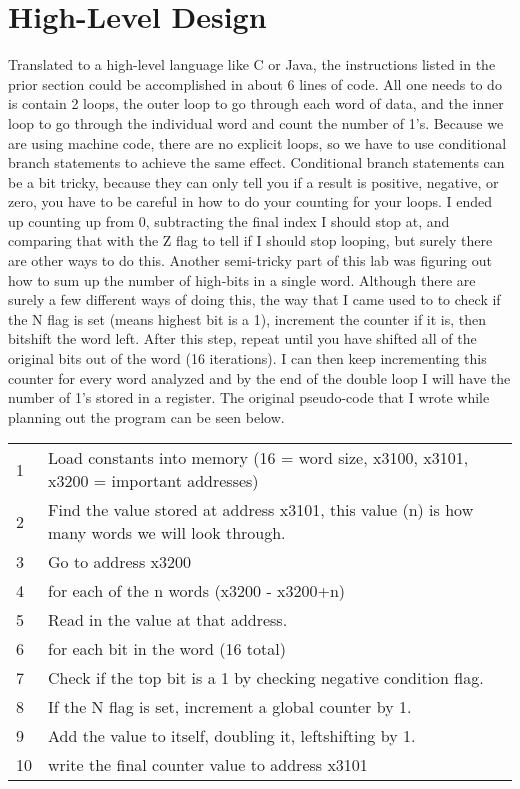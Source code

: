 \documentclass[a4paper,11pt]{article}
\begin{document}
\section{High-Level Design}
Translated to a high-level language like C or Java, the instructions listed in the prior section could be accomplished in about 6 lines of code. All one needs to do is contain 2 loops, the outer loop to go through each word of data, and the inner loop to go through the individual word and count the number of 1's. Because we are using machine code, there are no explicit loops, so we have to use conditional branch statements to achieve the same effect. Conditional branch statements can be a bit tricky, because they can only tell you if a result is positive, negative, or zero, you have to be careful in how to do your counting for your loops. I ended up counting up from 0, subtracting the final index I should stop at, and comparing that with the Z flag to tell if I should stop looping, but surely there are other ways to do this. Another semi-tricky part of this lab was figuring out how to sum up the number of high-bits in a single word. Although there are surely a few different ways of doing this, the way that I came used to to check if the N flag is set (means highest bit is a 1), increment the counter if it is, then bitshift the word left. After this step, repeat until you have shifted all of the original bits out of the word (16 iterations). I can then keep incrementing this counter for every word analyzed and by the end of the double loop I will have the number of 1's stored in a register. The original pseudo-code that I wrote while planning out the program can be seen below.

 \begin{tabular}{l | l}
 1 & Load constants into memory (16 = word size, x3100, x3101, x3200 = important addresses) \\
 2 & Find the value stored at address x3101, this value (n) is how many words we will look through. \\
 3 & Go to address x3200 \\
 4 & for each of the n words (x3200 - x3200+n) \\
 5 & \quad Read in the value at that address. \\
 6 & \quad  for each bit in the word (16 total) \\
 7 & \qquad      Check if the top bit is a 1 by checking negative condition flag. \\
 8 & \qquad      If the N flag is set, increment a global counter by 1. \\
 9 & \qquad       Add the value to itself, doubling it, leftshifting by 1. \\
 10 & \quad write the final counter value to address x3101 \\
 \end{tabular} \\
\end{document}
